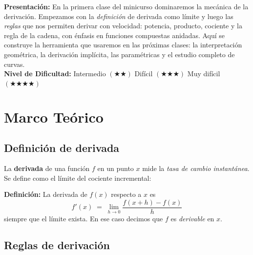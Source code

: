 \documentclass[12pt, letterpaper]{article}
\begin{document}


\vspace{4pt}
\begin{cuadroinfo}
  \small
  \textbf{Presentación:} En la primera clase del minicurso dominaremos la mecánica de la derivación. Empezamos con la \emph{definición} de derivada como límite y luego las \emph{reglas} que nos permiten derivar con velocidad: potencia, producto, cociente y la regla de la cadena, con énfasis en funciones compuestas anidadas. Aquí se construye la herramienta que usaremos en las próximas clases: la interpretación geométrica, la derivación implícita, las paramétricas y el estudio completo de curvas.
  \\[6pt]
  \textbf{Nivel de Dificultad:}\quad
  \medio{} Intermedio $(\bigstar\bigstar)$ \quad
  \dificil{} Difícil $(\bigstar\bigstar\bigstar)$ \quad
  \muyDificil{} Muy difícil $(\bigstar\bigstar\bigstar\bigstar)$
\end{cuadroinfo}

\vspace{8pt}

\section{Marco Teórico}

\subsection{Definición de derivada}

La \textbf{derivada} de una función $f$ en un punto $x$ mide la \emph{tasa de cambio instantánea}. Se define como el límite del cociente incremental:

\begin{cuadroteoria}
  \textbf{Definición:} La derivada de $f(x)$ respecto a $x$ es
  \[
    f'(x) \;=\; \lim_{h \to 0} \frac{f(x+h) - f(x)}{h}
  \]
  siempre que el límite exista. En ese caso decimos que $f$ es \emph{derivable} en $x$.
\end{cuadroteoria}

\subsection{Reglas de derivación}
\end{document}
